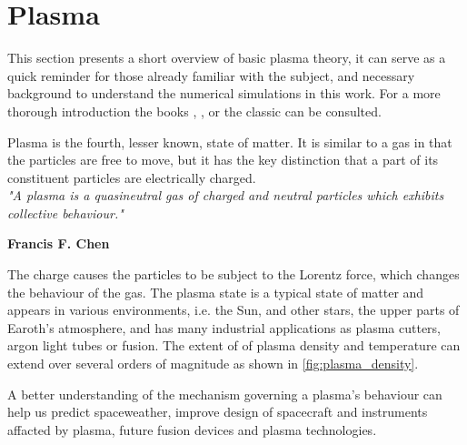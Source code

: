 \section{Plasma}
	\label{sec:plasma}
	This section presents a short overview of basic plasma theory, it can serve as a
	quick reminder for those already familiar with the subject, and necessary
	background to understand the numerical simulations in this work.
	For a more thorough introduction the books \textit{}
    \citep{fitzpatrick_plasma_2014}, \textit{} \citep{goldston_introduction_1995},
    \textit{} \citep{pecseli_waves_2012} or the classic
    \textit{} \citep{chen_introduction_1984} can be consulted.

	Plasma is the fourth, lesser known, state of matter. It is similar to a gas
	in that the particles are free to move, but it has the key distinction that
	a part of its constituent particles are electrically charged.
	\\[1.0cm]
	\indent \textit{\large"A plasma is a quasineutral gas of charged and neutral particles which exhibits
	collective behaviour."}
	\begin{flushright}
	    \textbf{Francis F. Chen}\\[1.0cm]
	\end{flushright}
	The charge causes the particles to be subject to the Lorentz force, which
	changes the behaviour of the gas. The plasma state is a typical state of matter
	and appears in various environments, i.e. the Sun, and other stars, the upper parts of Earoth's atmosphere,
 	and has many industrial applications as plasma cutters, argon light tubes or fusion.
	The extent of of plasma density and temperature can extend over several orders of magnitude as shown in \cref{fig:plasma_density}.

	A better understanding of the mechanism governing a plasma's behaviour can help
	us predict spaceweather, improve design of spacecraft and instruments affacted by plasma, future fusion devices and plasma technologies.

